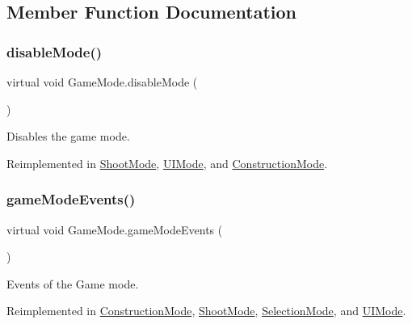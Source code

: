 \subsection{Member Function Documentation}
\mbox{\label{class_game_mode_a5aea49bdae2459b78e1972dd0a34918e}} 
\subsubsection{\texorpdfstring{disable\+Mode()}{disableMode()}}
{\footnotesize\ttfamily virtual void Game\+Mode.\+disable\+Mode (\begin{DoxyParamCaption}{ }\end{DoxyParamCaption})\hspace{0.3cm}{\ttfamily [virtual]}}



Disables the game mode. 



Reimplemented in \mbox{\hyperlink{class_shoot_mode_a172531ba502bfea3d75404e1c890db6b}{Shoot\+Mode}}, \mbox{\hyperlink{class_u_i_mode_a0dd6193dde5d68b9e1bc94f8a7468db5}{U\+I\+Mode}}, and \mbox{\hyperlink{class_construction_mode_a4229d5bd9df34fd90758404acd3b9cc8}{Construction\+Mode}}.

\mbox{\label{class_game_mode_a32a61bf0dfef83cfc1724b92f3d50cdf}} 
\subsubsection{\texorpdfstring{game\+Mode\+Events()}{gameModeEvents()}}
{\footnotesize\ttfamily virtual void Game\+Mode.\+game\+Mode\+Events (\begin{DoxyParamCaption}{ }\end{DoxyParamCaption})\hspace{0.3cm}{\ttfamily [virtual]}}



Events of the Game mode. 



Reimplemented in \mbox{\hyperlink{class_construction_mode_a58599c3aac705627c3b0fd034d54092a}{Construction\+Mode}}, \mbox{\hyperlink{class_shoot_mode_a3c9ab9c7883d23161205abebbc233c13}{Shoot\+Mode}}, \mbox{\hyperlink{class_selection_mode_a72054e5ce70eca2fbc50e8762a9d8c70}{Selection\+Mode}}, and \mbox{\hyperlink{class_u_i_mode_a9a0cb075f349e557e8aa8f9f55748c05}{U\+I\+Mode}}.

